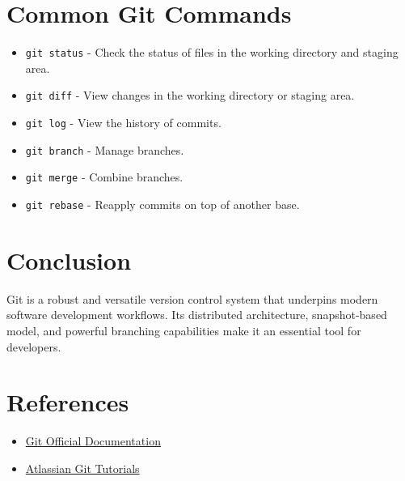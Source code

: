 \section{Common Git Commands}
\begin{itemize}
    \item \texttt{git status} - Check the status of files in the working directory and staging area.
    \item \texttt{git diff} - View changes in the working directory or staging area.
    \item \texttt{git log} - View the history of commits.
    \item \texttt{git branch} - Manage branches.
    \item \texttt{git merge} - Combine branches.
    \item \texttt{git rebase} - Reapply commits on top of another base.
\end{itemize}

\section{Conclusion}
Git is a robust and versatile version control system that underpins modern software development workflows. Its distributed architecture, snapshot-based model, and powerful branching capabilities make it an essential tool for developers.

\section*{References}
\begin{itemize}
    \item \href{https://git-scm.com/}{Git Official Documentation}
    \item \href{https://www.atlassian.com/git/tutorials}{Atlassian Git Tutorials}
\end{itemize}